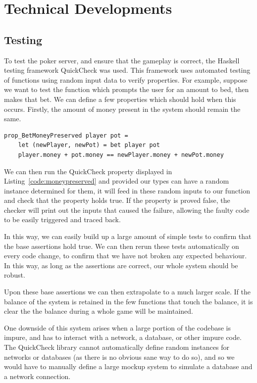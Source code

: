\section{Technical Developments}

\subsection{Testing}
To test the poker server, and ensure that the gameplay is correct, the
Haskell testing framework QuickCheck\parencite{claessen2000} was used. This
framework uses automated testing of functions using random input data to
verify properties. For example, suppose we want to test the function which
prompts the user for an amount to bed, then makes that bet. We can define a
few properties which should hold when this occurs.
Firstly, the amount of money present in the system should remain the same.

\begin{lstlisting}[label={code:moneypreserved}, caption=An example QuickCheck property]
prop_BetMoneyPreserved player pot =
    let (newPlayer, newPot) = bet player pot
    player.money + pot.money == newPlayer.money + newPot.money
\end{lstlisting}

We can then run the QuickCheck property displayed in Listing~\ref{code:moneypreserved}
and provided our types can have a random instance determined for them, it
will feed in these random inputs to our function and check that the property
holds true. If the property is proved false, the checker will print out the
inputs that caused the failure, allowing the faulty code to be easily triggered
and traced back.

In this way, we can easily build up a large amount of simple tests to confirm
that the base assertions hold true. We can then rerun these tests automatically
on every code change, to confirm that we have not broken any expected
behaviour. In this way, as long as the assertions are correct, our whole
system should be robust.

Upon these base assertions we can then extrapolate to a much larger scale.
If the balance of the system is retained in the few functions that touch
the balance, it is clear the the balance during a whole game will be maintained.

One downside of this system arises when a large portion of the codebase is
impure, and has to interact with a network, a database, or other impure code.
The QuickCheck library cannot automatically define random instances for
networks or databases (as there is no obvious sane way to do so), and so we
would have to manually define a large mockup system to simulate a database
and a network connection.

